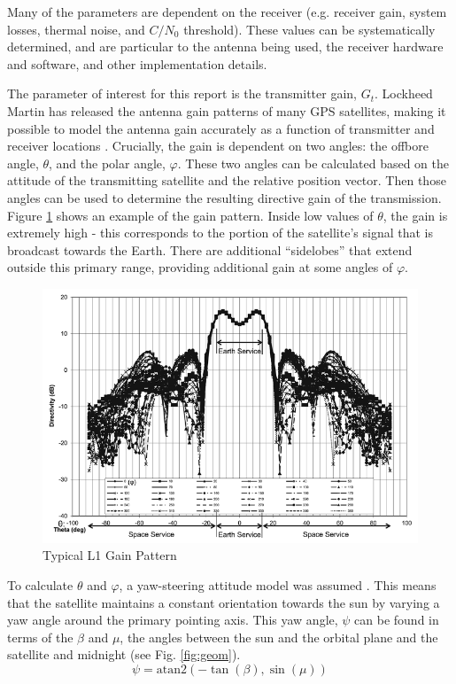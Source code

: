 \documentclass[11pt]{article}
\newcommand{\cnr}{C/N_0}
\begin{document}
Many of the parameters are dependent on the receiver (e.g. receiver gain, system losses, thermal noise, and  $\cnr$ threshold). These values can be systematically determined, and are particular to the antenna being used, the receiver hardware and software, and other implementation details.

The parameter of interest for this report is the transmitter gain, $G_t$. Lockheed Martin has released the antenna gain patterns of many GPS satellites, making it possible to model the antenna gain accurately as a function of transmitter and receiver locations \cite{lockheed}. Crucially, the gain is dependent on two angles: the offbore angle, $\theta$, and the polar angle, $\varphi$. These two angles can be calculated based on the attitude of the transmitting satellite and the relative position vector. Then those angles can be used to determine the resulting directive gain of the transmission. Figure \ref{fig:examplegain} shows an example of the gain pattern. Inside low values of $\theta$, the gain is extremely high - this corresponds to the portion of the satellite's signal that is broadcast towards the Earth. There are additional ``sidelobes'' that extend outside this primary range, providing additional gain at some angles of $\varphi$.

\begin{figure}[h]
\centering
\includegraphics[width=.75\textwidth]{../Images/examplegain.png}
\caption{Typical L1 Gain Pattern}
\label{fig:examplegain}
\end{figure}

To calculate $\theta$ and $\varphi$, a yaw-steering attitude model was assumed \cite{orient}. This means that the satellite maintains a constant orientation towards the sun by varying a yaw angle around the primary pointing axis. This yaw angle, $\psi$ can be found in terms of the $\beta$ and $\mu$, the angles between the sun and the orbital plane and the satellite and midnight (see Fig. \ref{fig:geom}).
\begin{equation}
\psi = \text{atan2}(-\tan(\beta),\sin(\mu))
\label{eq:yaw}
\end{equation}
\end{document}
